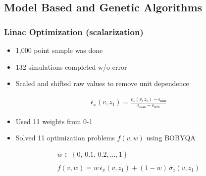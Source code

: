 \documentclass[professionalfonts,t]{beamer}
\begin{document}
{\subsection{Model Based and Genetic Algorithms}
\begin{frame}
\frametitle{Linac Optimization (scalarization)}
\begin{itemize}
\item{1,000 point sample was done}
\item{132 simulations completed w/o error}
\item{Scaled and shifted raw values to remove unit dependence}
\end{itemize}
\begin{align*}
\bar{\epsilon}_x (v,z_1) = \frac{ \epsilon_x (v,z_1) - \epsilon_{\min} } { \epsilon_{\max} - \epsilon_{\min} }
\end{align*}
\begin{itemize}
\item{Used 11 weights from 0-1}
\item{Solved 11 optimization problems $f(v,w)$ using BOBYQA}
\end{itemize}
\begin{gather*}
w\in\left\{ 0, \,0.1, \,0.2, \ldots, 1 \right\}\\ \\
f(v,w) = w \,\bar{\epsilon}_x(v,z_1) + (1-w)\, \bar{\sigma}_z(v,z_1)
\end{gather*}
\end{frame}

}
\end{document}
